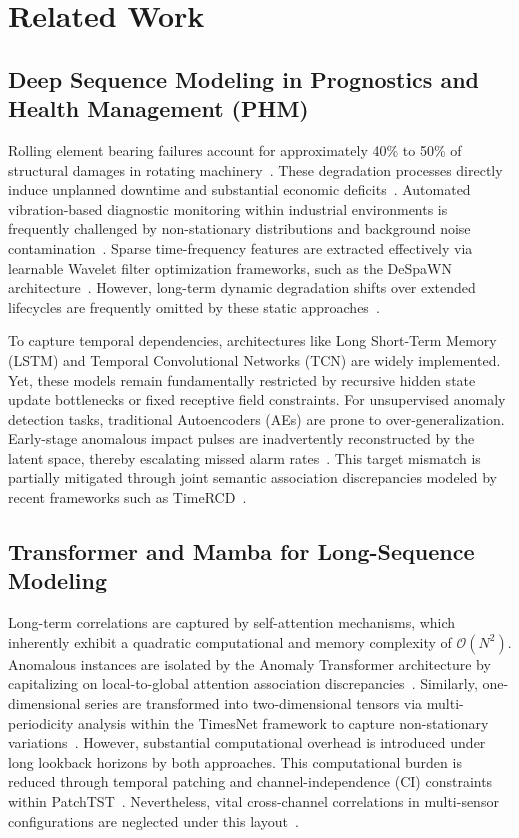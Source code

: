\documentclass[cmes,article,submit,moreauthors,pdftex]{Definitions/tsp}
\begin{document}
\section{Related Work} \label{sect:s2}

\subsection{Deep Sequence Modeling in Prognostics and Health Management (PHM)} \label{sect:s2dot1}
Rolling element bearing failures account for approximately 40\% to 50\% of structural damages in rotating machinery~\cite{ref-1}. These degradation processes directly induce unplanned downtime and substantial economic deficits~\cite{ref-1}. Automated vibration-based diagnostic monitoring within industrial environments is frequently challenged by non-stationary distributions and background noise contamination~\cite{ref-1}. Sparse time-frequency features are extracted effectively via learnable Wavelet filter optimization frameworks, such as the DeSpaWN architecture~\cite{ref-11}. However, long-term dynamic degradation shifts over extended lifecycles are frequently omitted by these static approaches~\cite{ref-1}.

To capture temporal dependencies, architectures like Long Short-Term Memory (LSTM) and Temporal Convolutional Networks (TCN) are widely implemented. Yet, these models remain fundamentally restricted by recursive hidden state update bottlenecks or fixed receptive field constraints. For unsupervised anomaly detection tasks, traditional Autoencoders (AEs) are prone to over-generalization. Early-stage anomalous impact pulses are inadvertently reconstructed by the latent space, thereby escalating missed alarm rates~\cite{ref-12}. This target mismatch is partially mitigated through joint semantic association discrepancies modeled by recent frameworks such as TimeRCD~\cite{ref-12}.

\subsection{Transformer and Mamba for Long-Sequence Modeling} \label{sect:s2dot2}
Long-term correlations are captured by self-attention mechanisms, which inherently exhibit a quadratic computational and memory complexity of $\mathcal{O}(N^2)$. Anomalous instances are isolated by the Anomaly Transformer architecture by capitalizing on local-to-global attention association discrepancies~\cite{ref-2}. Similarly, one-dimensional series are transformed into two-dimensional tensors via multi-periodicity analysis within the TimesNet framework to capture non-stationary variations~\cite{ref-3}. However, substantial computational overhead is introduced under long lookback horizons by both approaches. This computational burden is reduced through temporal patching and channel-independence (CI) constraints within PatchTST~\cite{ref-4}. Nevertheless, vital cross-channel correlations in multi-sensor configurations are neglected under this layout~\cite{ref-4}.
\end{document}
